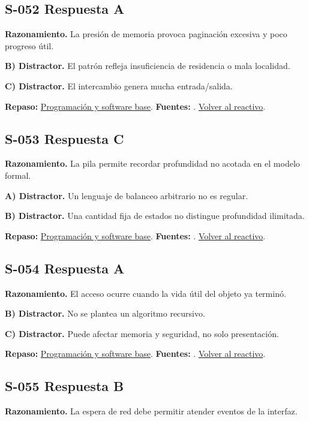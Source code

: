 \subsection*{S-052 \quad Respuesta A}\label{s:S-052}
\textbf{Razonamiento.} La presión de memoria provoca paginación excesiva y poco progreso útil.

\textbf{B) Distractor. }El patrón refleja insuficiencia de residencia o mala localidad.

\textbf{C) Distractor. }El intercambio genera mucha entrada/salida.

\textbf{Repaso:} \hyperref[sec:s2]{Programación y software base}. \textbf{Fuentes:} \cite{ostep,cppreference,compiler}. \hyperref[q:S-052]{Volver al reactivo}.\par\medskip

\subsection*{S-053 \quad Respuesta C}\label{s:S-053}
\textbf{Razonamiento.} La pila permite recordar profundidad no acotada en el modelo formal.

\textbf{A) Distractor. }Un lenguaje de balanceo arbitrario no es regular.

\textbf{B) Distractor. }Una cantidad fija de estados no distingue profundidad ilimitada.

\textbf{Repaso:} \hyperref[sec:s2]{Programación y software base}. \textbf{Fuentes:} \cite{ostep,cppreference,compiler}. \hyperref[q:S-053]{Volver al reactivo}.\par\medskip

\subsection*{S-054 \quad Respuesta A}\label{s:S-054}
\textbf{Razonamiento.} El acceso ocurre cuando la vida útil del objeto ya terminó.

\textbf{B) Distractor. }No se plantea un algoritmo recursivo.

\textbf{C) Distractor. }Puede afectar memoria y seguridad, no solo presentación.

\textbf{Repaso:} \hyperref[sec:s2]{Programación y software base}. \textbf{Fuentes:} \cite{ostep,cppreference,compiler}. \hyperref[q:S-054]{Volver al reactivo}.\par\medskip

\subsection*{S-055 \quad Respuesta B}\label{s:S-055}
\textbf{Razonamiento.} La espera de red debe permitir atender eventos de la interfaz.

